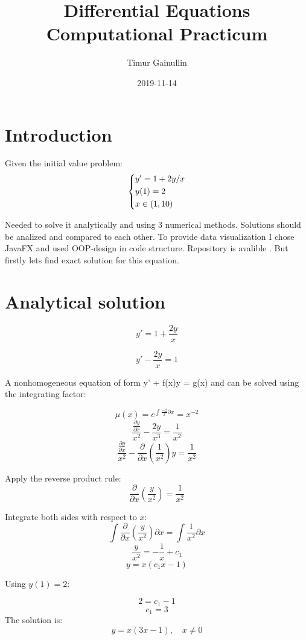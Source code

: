 \documentclass{article}
\title{Differential Equations Computational Practicum}
\date{2019-11-14}
\author{Timur Gainullin}
\begin{document}
  \maketitle

  \newpage



\section{Introduction}

Given the initial value problem:
\[
  \begin{dcases}
    y' = 1 + 2y / x\\
    y(1) = 2\\
    x \in (1, 10)
  \end{dcases}
\]

Needed to solve it analytically and using 3 numerical methods. Solutions should be analized and compared to each other. To provide data visualization I chose JavaFX and used OOP-design in code structure. Repository is avalible
\href{https://github.com/Tumypmyp/DE_Practicum}{}. But firstly lets find exact solution for this equation.


\section{Analytical solution}

  $$y' = 1 + \frac{2y}{x}$$

  $$y' - \frac{2y}{x} = 1$$

A nonhomogeneous equation of form y' + f(x)y = g(x) and can be
solved using the integrating factor:

  $$\mu(x) = e^{\int{\frac{-2}{x} \partial x}} = x^{-2}$$
  $$\frac{\frac{\partial y}{\partial x}}{x^2} - \frac{2y}{x^3} = \frac{1}{x^2}$$
  $$\frac{\frac{\partial y}{\partial x}}{x^2} - \frac{\partial}{\partial x}\left(\frac{1}{x^2}\right)y = \frac{1}{x^2}$$

Apply the reverse product rule:
  $$\frac{\partial}{\partial x}\left(\frac{y}{x^2}\right) = \frac{1}{x^2}$$

Integrate both sides with respect to $x$:
  $$\int{\frac{\partial}{\partial x}\left(\frac{y}{x^2}\right)}\partial x = \int{\frac{1}{x^2}}\partial x$$
  $$ \frac{y}{x^2} = -\frac{1}{x} + c_1$$
  $$y = x(c_1x - 1)$$

Using $y(1) = 2$:

  $$2 = c_1 - 1$$
  $$c_1 = 3$$
The solution is:
  $$y = x(3x - 1), \quad x \neq 0$$
\end{document}
